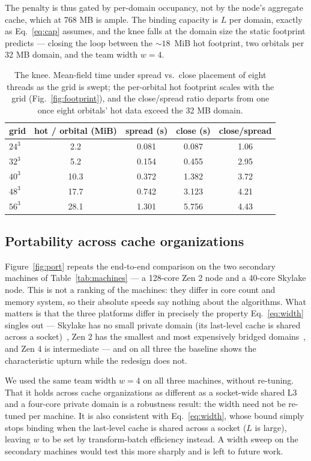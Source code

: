 \documentclass[preprint,12pt]{elsarticle}
\numberwithin{equation}{section}
\begin{document}
The penalty is thus gated by per-domain occupancy, not by the node's aggregate cache, which at 768 MB is ample. The binding capacity is $L$ per domain, exactly as Eq.~\eqref{eq:cap} assumes, and the knee falls at the domain size the static footprint predicts --- closing the loop between the ${\sim}18$~MiB hot footprint, two orbitals per 32 MB domain, and the team width $w=4$.

\begin{table}[tbp]\centering
\caption{The knee. Mean-field time under spread vs.\ close placement of eight threads as the grid is swept; the per-orbital hot footprint scales with the grid (Fig.~\ref{fig:footprint}), and the close/spread ratio departs from one once eight orbitals' hot data exceed the 32 MB domain.}
\label{tab:knee}
\begin{tabular}{lcccc}\toprule
grid & hot / orbital (MiB) & spread (s) & close (s) & close/spread\\\midrule
$24^3$ & 2.2 & 0.081 & 0.087 & 1.06\\
$32^3$ & 5.2 & 0.154 & 0.455 & 2.95\\
$40^3$ & 10.3 & 0.372 & 1.382 & 3.72\\
$48^3$ & 17.7 & 0.742 & 3.123 & 4.21\\
$56^3$ & 28.1 & 1.301 & 5.756 & 4.43\\\bottomrule
\end{tabular}
\end{table}

\subsection{Portability across cache organizations}\label{sec:port}
Figure~\ref{fig:port} repeats the end-to-end comparison on the two secondary machines of Table~\ref{tab:machines} --- a 128-core Zen 2 node and a 40-core Skylake node. This is not a ranking of the machines: they differ in core count and memory system, so their absolute speeds say nothing about the algorithms. What matters is that the three platforms differ in precisely the property Eq.~\eqref{eq:width} singles out --- Skylake has no small private domain (its last-level cache is shared across a socket)~\cite{intel_skylake}, Zen 2 has the smallest and most expensively bridged domains~\cite{amd_rome}, and Zen 4 is intermediate --- and on all three the baseline shows the characteristic upturn while the redesign does not.

We used the same team width $w=4$ on all three machines, without re-tuning. That it holds across cache organizations as different as a socket-wide shared L3 and a four-core private domain is a robustness result: the width need not be re-tuned per machine. It is also consistent with Eq.~\eqref{eq:width}, whose bound simply stops binding when the last-level cache is shared across a socket ($L$ is large), leaving $w$ to be set by transform-batch efficiency instead. A width sweep on the secondary machines would test this more sharply and is left to future work.
\end{document}
